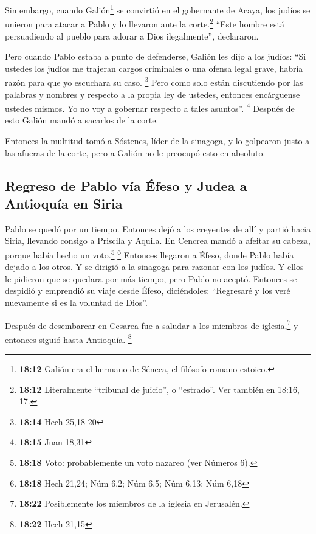  Sin embargo, cuando Galión\footnote{\textbf{18:12}
  Galión era el hermano de Séneca, el filósofo romano estoico.} se
convirtió en el gobernante de Acaya, los judíos se unieron para atacar a
Pablo y lo llevaron ante la corte.\footnote{\textbf{18:12} Literalmente
  ``tribunal de juicio'', o ``estrado''. Ver también en 18:16, 17.}
 ``Este hombre está persuadiendo al pueblo para adorar a
Dios ilegalmente'', declararon.

 Pero cuando Pablo estaba a punto de defenderse, Galión
les dijo a los judíos: ``Si ustedes los judíos me trajeran cargos
criminales o una ofensa legal grave, habría razón para que yo escuchara
su caso. \footnote{\textbf{18:14} Hech 25,18-20}  Pero
como solo están discutiendo por las palabras y nombres y respecto a la
propia ley de ustedes, entonces encárguense ustedes mismos. Yo no voy a
gobernar respecto a tales asuntos''. \footnote{\textbf{18:15} Juan 18,31}
 Después de esto Galión mandó a sacarlos de la corte.

 Entonces la multitud tomó a Sóstenes, líder de la
sinagoga, y lo golpearon justo a las afueras de la corte, pero a Galión
no le preocupó esto en absoluto.

\hypertarget{regreso-de-pablo-vuxeda-uxe9feso-y-judea-a-antioquuxeda-en-siria}{%
\subsection{Regreso de Pablo vía Éfeso y Judea a Antioquía en
Siria}\label{regreso-de-pablo-vuxeda-uxe9feso-y-judea-a-antioquuxeda-en-siria}}

 Pablo se quedó por un tiempo. Entonces dejó a los
creyentes de allí y partió hacia Siria, llevando consigo a Priscila y
Aquila. En Cencrea mandó a afeitar su cabeza, porque había hecho un
voto.\footnote{\textbf{18:18} Voto: probablemente un voto nazareo (ver
  Números 6).} \footnote{\textbf{18:18} Hech 21,24; Núm 6,2; Núm 6,5;
  Núm 6,13; Núm 6,18}  Entonces llegaron a Éfeso, donde
Pablo había dejado a los otros. Y se dirigió a la sinagoga para razonar
con los judíos.  Y ellos le pidieron que se quedara por
más tiempo, pero Pablo no aceptó.  Entonces se despidió y
emprendió su viaje desde Éfeso, diciéndoles: ``Regresaré y los veré
nuevamente si es la voluntad de Dios''.

 Después de desembarcar en Cesarea fue a saludar a los
miembros de iglesia,\footnote{\textbf{18:22} Posiblemente los miembros
  de la iglesia en Jerusalén.} y entonces siguió hasta Antioquía.
\footnote{\textbf{18:22} Hech 21,15}

